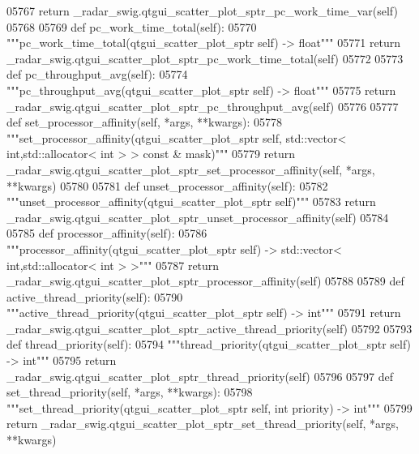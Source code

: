 \begin{DoxyCode}
{{{{{{{{{{{{{{{{{{{05767         \textcolor{keywordflow}{return} \_radar\_swig.qtgui\_scatter\_plot\_sptr\_pc\_work\_time\_var(self)
05768 
05769     \textcolor{keyword}{def }pc_work_time_total(self):
05770         \textcolor{stringliteral}{"""pc\_work\_time\_total(qtgui\_scatter\_plot\_sptr self) -> float"""}
05771         \textcolor{keywordflow}{return} \_radar\_swig.qtgui\_scatter\_plot\_sptr\_pc\_work\_time\_total(self)
05772 
05773     \textcolor{keyword}{def }pc_throughput_avg(self):
05774         \textcolor{stringliteral}{"""pc\_throughput\_avg(qtgui\_scatter\_plot\_sptr self) -> float"""}
05775         \textcolor{keywordflow}{return} \_radar\_swig.qtgui\_scatter\_plot\_sptr\_pc\_throughput\_avg(self)
05776 
05777     \textcolor{keyword}{def }set_processor_affinity(self, *args, **kwargs):
05778         \textcolor{stringliteral}{"""set\_processor\_affinity(qtgui\_scatter\_plot\_sptr self, std::vector< int,std::allocator< int > >
       const & mask)"""}
05779         \textcolor{keywordflow}{return} \_radar\_swig.qtgui\_scatter\_plot\_sptr\_set\_processor\_affinity(self, *args, **kwargs)
05780 
05781     \textcolor{keyword}{def }unset_processor_affinity(self):
05782         \textcolor{stringliteral}{"""unset\_processor\_affinity(qtgui\_scatter\_plot\_sptr self)"""}
05783         \textcolor{keywordflow}{return} \_radar\_swig.qtgui\_scatter\_plot\_sptr\_unset\_processor\_affinity(self)
05784 
05785     \textcolor{keyword}{def }processor_affinity(self):
05786         \textcolor{stringliteral}{"""processor\_affinity(qtgui\_scatter\_plot\_sptr self) -> std::vector< int,std::allocator< int > >"""}
05787         \textcolor{keywordflow}{return} \_radar\_swig.qtgui\_scatter\_plot\_sptr\_processor\_affinity(self)
05788 
05789     \textcolor{keyword}{def }active_thread_priority(self):
05790         \textcolor{stringliteral}{"""active\_thread\_priority(qtgui\_scatter\_plot\_sptr self) -> int"""}
05791         \textcolor{keywordflow}{return} \_radar\_swig.qtgui\_scatter\_plot\_sptr\_active\_thread\_priority(self)
05792 
05793     \textcolor{keyword}{def }thread_priority(self):
05794         \textcolor{stringliteral}{"""thread\_priority(qtgui\_scatter\_plot\_sptr self) -> int"""}
05795         \textcolor{keywordflow}{return} \_radar\_swig.qtgui\_scatter\_plot\_sptr\_thread\_priority(self)
05796 
05797     \textcolor{keyword}{def }set_thread_priority(self, *args, **kwargs):
05798         \textcolor{stringliteral}{"""set\_thread\_priority(qtgui\_scatter\_plot\_sptr self, int priority) -> int"""}
05799         \textcolor{keywordflow}{return} \_radar\_swig.qtgui\_scatter\_plot\_sptr\_set\_thread\_priority(self, *args, **kwargs)
}}}}}}}}}}}}}}}}}}}
\end{DoxyCode}
